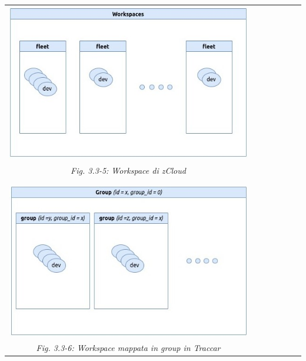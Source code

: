 \documentclass[a4paper,titlepage,12pt]{report}
\begin{document}
{\begin{center}
\begin{tabular}{c c c cc c c}
\includegraphics[scale=0.55]{images/wks.jpg}\\ 
\textit{Fig. 3.3-5: Workspace di zCloud}\\
\\
\\
\includegraphics[scale=0.55]{images/groups.jpg} \\
\textit{Fig. 3.3-6: Workspace mappata in group in Traccar}

\end{tabular}
\end{center}

}
\end{document}
